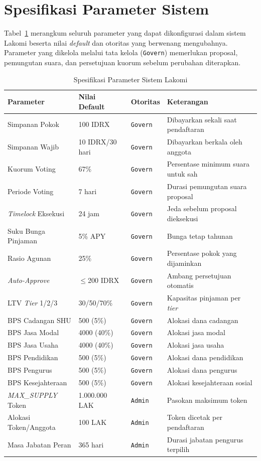 \section{Spesifikasi Parameter Sistem}

Tabel~\ref{tab:system-params} merangkum seluruh parameter yang dapat dikonfigurasi dalam sistem Lakomi beserta nilai \textit{default} dan otoritas yang berwenang mengubahnya. Parameter yang dikelola melalui tata kelola (\texttt{Govern}) memerlukan proposal, pemungutan suara, dan persetujuan kuorum sebelum perubahan diterapkan.

\begin{table}[H]
\centering
\caption{Spesifikasi Parameter Sistem Lakomi}
\label{tab:system-params}
\footnotesize
\begin{tabular}{p{}p{}p{}p{}}
\toprule
\textbf{Parameter} & \textbf{Nilai Default} & \textbf{Otoritas} & \textbf{Keterangan} \\
\midrule
Simpanan Pokok & 100 IDRX & \texttt{Govern} & Dibayarkan sekali saat pendaftaran \\
Simpanan Wajib & 10 IDRX/30 hari & \texttt{Govern} & Dibayarkan berkala oleh anggota \\
Kuorum Voting & 67\% & \texttt{Govern} & Persentase minimum suara untuk sah \\
Periode Voting & 7 hari & \texttt{Govern} & Durasi pemungutan suara proposal \\
\textit{Timelock} Eksekusi & 24 jam & \texttt{Govern} & Jeda sebelum proposal dieksekusi \\
Suku Bunga Pinjaman & 5\% APY & \texttt{Govern} & Bunga tetap tahunan \\
Rasio Agunan & 25\% & \texttt{Govern} & Persentase pokok yang dijaminkan \\
\textit{Auto-Approve} & $\leq$200 IDRX & \texttt{Govern} & Ambang persetujuan otomatis \\
LTV \textit{Tier} 1/2/3 & 30/50/70\% & \texttt{Govern} & Kapasitas pinjaman per \textit{tier} \\
BPS Cadangan SHU & 500 (5\%) & \texttt{Govern} & Alokasi dana cadangan \\
BPS Jasa Modal & 4000 (40\%) & \texttt{Govern} & Alokasi jasa modal \\
BPS Jasa Usaha & 4000 (40\%) & \texttt{Govern} & Alokasi jasa usaha \\
BPS Pendidikan & 500 (5\%) & \texttt{Govern} & Alokasi dana pendidikan \\
BPS Pengurus & 500 (5\%) & \texttt{Govern} & Alokasi dana pengurus \\
BPS Kesejahteraan & 500 (5\%) & \texttt{Govern} & Alokasi kesejahteraan sosial \\
\textit{MAX\_SUPPLY} Token & 1.000.000 LAK & \texttt{Admin} & Pasokan maksimum token \\
Alokasi Token/Anggota & 100 LAK & \texttt{Admin} & Token dicetak per pendaftaran \\
Masa Jabatan Peran & 365 hari & \texttt{Admin} & Durasi jabatan pengurus terpilih \\
\bottomrule
\end{tabular}
\end{table}

